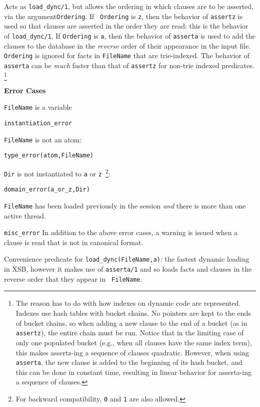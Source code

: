\begin{description}
 \label{load_dync/2}
%
  Acts as {\tt load\_dync/1}, but allows the ordering in which clauses
  are to be asserted, via the argument{\tt Ordering}.  If {\tt
    Ordering} is {\tt z}, then the behavior of {\tt assertz} is used
  so that clauses are asserted in the order they are read: this is the
  behavior of {\tt load\_dync/1}.  If {\tt Ordering} is {\tt a}, then
  the behavior of {\tt asserta} is used to add the clauses to the
  database in the {\em reverse} order of their appearance in the input
  file.  {\tt Ordering} is ignored for facts in {\tt FileName} that
  are trie-indexed.  The behavior of {\tt asserta} can be {\em much}
  faster than that of {\tt assertz} for non-trie indexed
  predicates. \footnote{The reason has to do with how indexes on
    dynamic code are represented.  Indexes use hash tables with bucket
    chains.  No pointers are kept to the ends of bucket chains, so
    when adding a new clause to the end of a bucket (as in {\tt
      assertz}), the entire chain must be run.  Notice that in the
    limiting case of only one populated bucket (e.g., when all clauses
    have the same index term), this makes assertz-ing a sequence of
    clauses quadratic.  However, when using {\tt asserta}, the new
    clause is added to the beginning of its hash bucket, and this can
    be done in constant time, resulting in linear behavior for
    asserta-ing a sequence of clauses.}  

{\bf Error Cases}
\bi
\item 	{\tt FileName} is a variable
\bi
\item 	{\tt instantiation\_error}
\ei
\item 	{\tt FileName} is not an atom:
\bi
\item 	{\tt type\_error(atom,FileName)}
\ei
%
\item 	{\tt Dir} is not instantiated to {\tt a} or {\tt z}~\footnote{For
backward compatibility, {\tt 0} and {\tt 1} are also allowed.}: 
\bi
\item 	{\tt domain\_error(a\_or\_z,Dir)}
\ei
%
\item {\tt FileName} has been loaded previously in the session {\em and}
  there is more than one active thread.  
\bi
\item 	{\tt misc\_error}
\ei
\ei
%
  In addition to the above error cases, a warning is issued when a
  clause is read that is not in canonical format.


 \label{load_dync/3}
%
Convenience predicate for {\tt load\_dync(FileName,a)}: the fastest
dynamic loading in XSB, however it makes use of {\tt asserta/1} and so
loads facts and clauses in the reverse order that they appear in {\tt
  FileName}.


\end{description}

